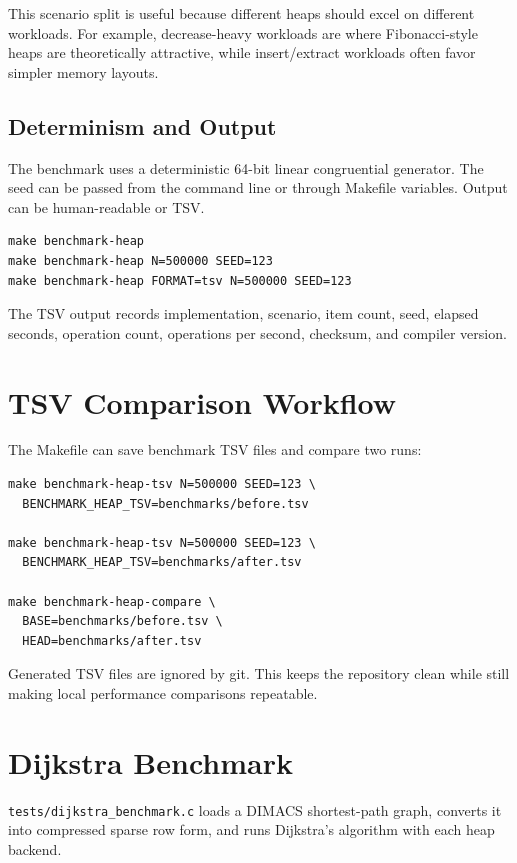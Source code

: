 This scenario split is useful because different heaps should excel on different workloads.
For example, decrease-heavy workloads are where Fibonacci-style heaps are theoretically attractive, while insert/extract workloads often favor simpler memory layouts.

\subsection{Determinism and Output}

The benchmark uses a deterministic 64-bit linear congruential generator.
The seed can be passed from the command line or through Makefile variables.
Output can be human-readable or TSV.

\begin{lstlisting}[style=shellstyle, caption={Heap benchmark commands.}]
make benchmark-heap
make benchmark-heap N=500000 SEED=123
make benchmark-heap FORMAT=tsv N=500000 SEED=123
\end{lstlisting}

The TSV output records implementation, scenario, item count, seed, elapsed seconds, operation count, operations per second, checksum, and compiler version.

\section{TSV Comparison Workflow}

The Makefile can save benchmark TSV files and compare two runs:

\begin{lstlisting}[style=shellstyle, caption={Saving and comparing benchmark runs.}]
make benchmark-heap-tsv N=500000 SEED=123 \
  BENCHMARK_HEAP_TSV=benchmarks/before.tsv

make benchmark-heap-tsv N=500000 SEED=123 \
  BENCHMARK_HEAP_TSV=benchmarks/after.tsv

make benchmark-heap-compare \
  BASE=benchmarks/before.tsv \
  HEAD=benchmarks/after.tsv
\end{lstlisting}

Generated TSV files are ignored by git.
This keeps the repository clean while still making local performance comparisons repeatable.

\section{Dijkstra Benchmark}

\texttt{tests/dijkstra\_benchmark.c} loads a DIMACS shortest-path graph, converts it into compressed sparse row form, and runs Dijkstra's algorithm with each heap backend.


